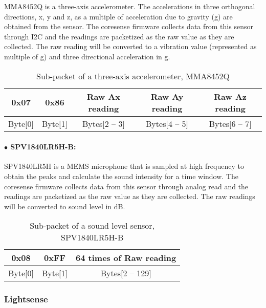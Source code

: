 MMA8452Q is a three-axis accelerometer. The accelerations in three orthogonal directions, x, y and z, as a multiple of acceleration due to gravity (g) are obtained from the sensor. The coresense firmware collects data from this sensor through I2C and the readings are packetized as the raw value as they are collected.
The raw reading will be converted to a vibration value (represented as multiple of g) and three directional acceleration in g.

\begin{table}[h!]
    \centering
    \caption{Sub-packet of a three-axis accelerometer, MMA8452Q}
    \begin{tabular}{|c|c|c|c|c|}
        \hline
        \rowcolor{black!8}
        \textbf{0x07} & \textbf{0x86} & \textbf{Raw Ax reading} & \textbf{Raw Ay reading} & \textbf{Raw Az reading}\\
        \hline
        Byte[0] & Byte[1] & Bytes[2 -- 3] & Bytes[4 -- 5] & Bytes[6 -- 7] \\ \hline
    \end{tabular}
\end{table}

\paragraph{$\bullet$ SPV1840LR5H-B:}

SPV1840LR5H is a MEMS microphone that is sampled at high frequency to obtain the peaks and calculate the sound intensity for a time window.
The coresense firmware collects data from this sensor through analog read and the readings are packetized as the raw value as they are collected.
The raw readings will be converted to sound level in dB.
\\

\begin{table}[h!]
    \centering
    \caption{Sub-packet of a sound level sensor, SPV1840LR5H-B}
    \begin{tabular}{|c|c|c|}
        \hline
        \rowcolor{black!8}
        \textbf{0x08} & \textbf{0xFF} & \textbf{64 times of Raw reading} \\
        \hline
        Byte[0] & Byte[1] & Bytes[2 -- 129]\\ \hline
    \end{tabular}
\end{table}


\subsubsection{Lightsense}

